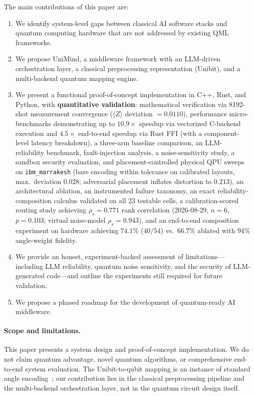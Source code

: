 ﻿\documentclass[12pt,a4paper]{article}
\begin{document}
The main contributions of this paper are:

\begin{enumerate}[leftmargin=2em]
    \item We identify system-level gaps between classical AI software stacks and quantum computing hardware that are not addressed by existing QML frameworks.
    \item We propose UniMind, a middleware framework with an LLM-driven orchestration layer, a classical preprocessing representation (Unibit), and a multi-backend quantum mapping engine.
    \item We present a functional proof-of-concept implementation in C++, Rust, and Python, with \textbf{quantitative validation}: mathematical verification via 8192-shot measurement convergence ($\langle Z \rangle$ deviation $= 0.0110$), performance micro-benchmarks demonstrating up to $10.9\times$ speedup via vectorized C-backend execution and $4.5\times$ end-to-end speedup via Rust FFI (with a component-level latency breakdown), a three-arm baseline comparison, an LLM-reliability benchmark, fault-injection analysis, a noise-sensitivity study, a sandbox security evaluation, and placement-controlled physical QPU sweeps on \texttt{ibm\_marrakesh} (bare encoding within tolerance on calibrated layouts, max.\ deviation $0.028$; adversarial placement inflates distortion to $0.213$), an architectural ablation, an instrumented failure taxonomy, an exact reliability-composition calculus validated on all 23 testable cells, a calibration-scored routing study achieving $\rho_s = 0.771$ rank correlation (2026-08-29, $n{=}6$, $p=0.103$; virtual noise-model $\rho_s=0.943$), and an end-to-end composition experiment on hardware achieving $74.1\%$ ($40/54$) vs.\ $66.7\%$ ablated with $94\%$ angle-weight fidelity.
    \item We provide an honest, experiment-backed assessment of limitations---including LLM reliability, quantum noise sensitivity, and the security of LLM-generated code---and outline the experiments still required for future validation.
    \item We propose a phased roadmap for the development of quantum-ready AI middleware.
\end{enumerate}

\paragraph{Scope and limitations.} This paper presents a system design and proof-of-concept implementation. We do not claim quantum advantage, novel quantum algorithms, or comprehensive end-to-end system evaluation. The Unibit-to-qubit mapping is an instance of standard angle encoding~\cite{schuld2021}; our contribution lies in the classical preprocessing pipeline and the multi-backend orchestration layer, not in the quantum circuit design itself.
\end{document}
